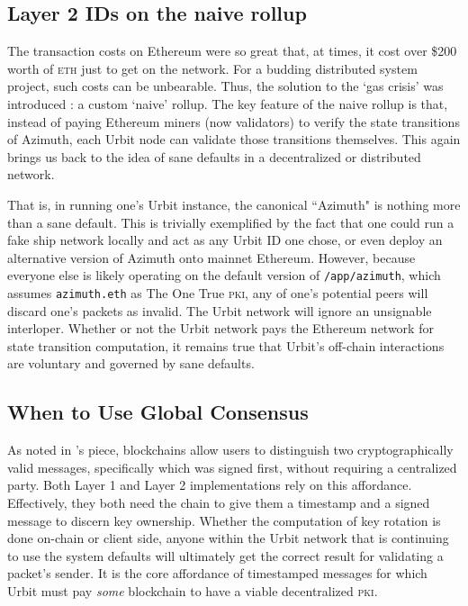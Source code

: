 \documentclass[twoside]{article}
\begin{document}
\subsection{Layer 2 IDs on the naive rollup}

The transaction costs on Ethereum were so great that, at times, it cost over \$200 worth of \textsc{eth} just to get on the network. For a budding distributed system project, such costs can be unbearable. Thus, the solution to the `gas crisis' was introduced \citep{Paprocki2021}: a custom `naive' rollup. The key feature of the naive rollup is that, instead of paying Ethereum miners (now validators) to verify the state transitions of Azimuth, each Urbit node can validate those transitions themselves. This again brings us back to the idea of sane defaults in a decentralized or distributed network.

That is, in running one's Urbit instance, the canonical ``Azimuth" is nothing more than a sane default. This is trivially exemplified by the fact that one could run a fake ship network locally and act as any Urbit ID one chose, or even deploy an alternative version of Azimuth onto mainnet Ethereum. However, because everyone else is likely operating on the default version of \lstinline[style=inlinecode]{/app/azimuth}, which assumes \lstinline[style=inlinecode]{azimuth.eth} as The One True \textsc{pki}, any of one's potential peers will discard one's packets as invalid. The Urbit network will ignore an unsignable interloper. Whether or not the Urbit network pays the Ethereum network for state transition computation, it remains true that Urbit's off-chain interactions are voluntary and governed by sane defaults.

\subsection{When to Use Global Consensus}

As noted in 's piece, blockchains allow users to distinguish two cryptographically valid messages, specifically which was signed first, without requiring a centralized party. Both Layer 1 and Layer 2 implementations rely on this affordance. Effectively, they both need the chain to give them a timestamp and a signed message to discern key ownership. Whether the computation of key rotation is done on-chain or client side, anyone within the Urbit network that is continuing to use the system defaults will ultimately get the correct result for validating a packet's sender. It is the core affordance of timestamped messages for which Urbit must pay \emph{some} blockchain to have a viable decentralized \textsc{pki}.
\end{document}
